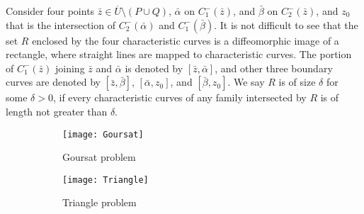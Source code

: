 \documentclass[11pt]{amsart}
\theoremstyle{plain}
\theoremstyle{remark}
\numberwithin{equation}{section}
\numberwithin{Thm}{section}
\begin{document}
Consider four points $\bar z\in \overline{U} \setminus (P \cup Q)$, $\bar\alpha$ on $C^-_1(\bar z)$, and $\bar\beta$ on $C^-_2(\bar z)$, and $z_0$ that is the intersection of $C^-_2(\bar\alpha)$ and $C^-_1(\bar\beta)$. It is not difficult to see that the set $R$ enclosed by the four characteristic curves is a diffeomorphic image of a rectangle, where straight lines are mapped to characteristic curves. The portion of $C^-_1(\bar z)$ joining $\bar z$ and $\bar \alpha$ is denoted by $[\bar z, \bar\alpha]$, and other three boundary curves are denoted by $[\bar z,\bar\beta]$, $[\bar\alpha, z_0]$, and $[\bar\beta, z_0]$. We say $R$ is of size $\delta$ for some $\delta>0$, if every characteristic curves of any family intersected by $R$ is of length not greater than $\delta$.
\begin{figure}[ht]
 \centering
 \begin{subfigure}[t]{2in}
 \centering
 \texttt{[image: Goursat]} 
 \caption{Goursat problem} \label{G}
 \end{subfigure} \quad \quad \quad 
 \begin{subfigure}[t]{2in}
 \centering
 \texttt{[image: Triangle]} 
 \caption{Triangle problem} \label{T}
 \end{subfigure}\\
 \vskip 10pt
 \begin{subfigure}[t]{2in}
 \centering

\end{subfigure}
\end{figure}
\end{document}
